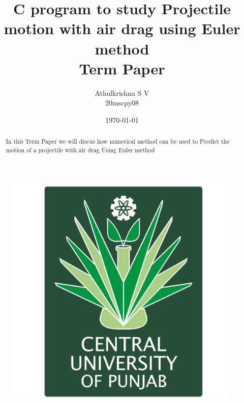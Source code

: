 \documentclass[12pt,a4paper]{article}
\begin{document}
    \title{\textbf{C program to study Projectile motion with air drag using Euler method}\\Term Paper}
	\author{Athulkrishna S V \\20mscpy08}
	\date{\today}
	\begin{figure}
		\centering
		\includegraphics[width=.6\textwidth]{logo.png}
	\end{figure}
	\maketitle

	\newpage

	\begin{abstract}
		In this Term Paper we will discus how numerical method can be used to Predict the motion of a projectile with air drag Using Euler method
	\end{abstract}
	
	\tableofcontents
	
	\newpage
\end{document}
